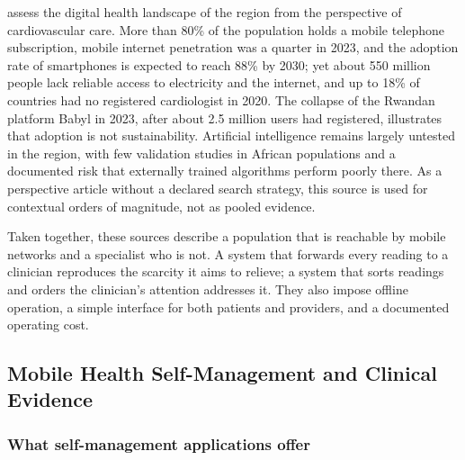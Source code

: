 \Textcite{segun2025} assess the digital health landscape of the region from the perspective of cardiovascular care. More than 80\% of the population holds a mobile telephone subscription, mobile internet penetration was a quarter in 2023, and the adoption rate of smartphones is expected to reach 88\% by 2030; yet about 550 million people lack reliable access to electricity and the internet, and up to 18\% of countries had no registered cardiologist in 2020. The collapse of the Rwandan platform Babyl in 2023, after about 2.5 million users had registered, illustrates that adoption is not sustainability. Artificial intelligence remains largely untested in the region, with few validation studies in African populations and a documented risk that externally trained algorithms perform poorly there. As a perspective article without a declared search strategy, this source is used for contextual orders of magnitude, not as pooled evidence.

Taken together, these sources describe a population that is reachable by mobile networks and a specialist who is not. A system that forwards every reading to a clinician reproduces the scarcity it aims to relieve; a system that sorts readings and orders the clinician's attention addresses it. They also impose offline operation, a simple interface for both patients and providers, and a documented operating cost.

\subsection{Mobile Health Self-Management and Clinical Evidence}\label{sec:outpatient}\label{sec:evidence}

\subsubsection{What self-management applications offer}\label{sec:apps}\label{sec:bct}

